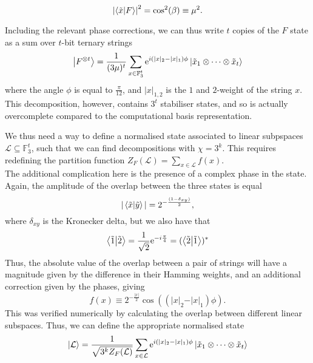 \documentclass{standalone}
\begin{document}
\begin{equation}
\left|\braket{\tilde{x}}{F}\right|^{2} = \cos^{2}(\beta)\equiv\mu^{2}.
\end{equation}
\par
Including the relevant phase corrections, we can thus write $t$ copies of the $F$ state as a sum over $t$-bit ternary strings
\begin{equation}
    \ket{F^{\otimes t}} = \frac{1}{(3\mu)^{t}}\sum_{x\in\mathbb{F}_{3}^{t}}\mathrm{e}^{i(\vert x\vert_{2}-\vert x\vert_{1})\phi}\ket{\tilde{x}_{1}\otimes\cdots\otimes\tilde{x}_{t}}
\end{equation}
where the angle $\phi$ is equal to $\frac{\pi}{12}$, and $\vert x\vert_{1,2}$ is the $1$ and $2$-weight of the string $x$.\\
This decomposition, however, contains $3^{t}$ stabiliser states, and so is actually overcomplete compared to the computational basis representation. 
\par
We thus need a way to define a normalised state associated to linear subpspaces $\mathcal{L}\subseteq\mathbb{F}_{3}^{t}$, such that we can find decompositions with $\chi=3^{k}$. This requires redefining the partition function $Z_{F}(\mathcal{L})=\sum_{x\in\mathcal{L}}f(x)$.\\
The additional complication here is the presence of a complex phase in the state. Again, the amplitude of the overlap between the three states is equal
\[\vert\braket{\tilde{x}}{\tilde{y}}\vert = 2^{-\frac{(1-\delta_{xy})}{2}},\]
where $\delta_{xy}$ is the Kronecker delta, but we also have that 
\[
\braket{\tilde{1}}{\tilde{2}}=\frac{1}{\sqrt{2}} 
\mathrm{e}^{-i\frac{\pi}{4}} 
= (\braket{\tilde{2}}{\tilde{1}})^*
\]
Thus, the absolute value of the overlap between a pair of strings will have a magnitude given by the difference in their Hamming weights, and an additional correction given by the phases, giving
\begin{equation}
    f(x)\equiv 2^{-\frac{\vert x\vert}{2}}\cos((\vert x\vert_{2}-\vert x\vert_{1})\phi).
\end{equation}
This was verified numerically by calculating the overlap between different linear subspaces. Thus, we can define the appropriate normalised state
\begin{equation}
    \ket{\mathcal{L}}=\frac{1}{\sqrt{3^{k}Z_{F}(\mathcal{L})}}\sum_{x\in\mathcal{L}}
    \mathrm{e}^{i(\vert x\vert_{2}-\vert x\vert_{1})\phi}\ket{\tilde{x}_{1}\otimes\cdots\otimes\tilde{x}_{t}}
\end{equation}
\par
\end{document}
